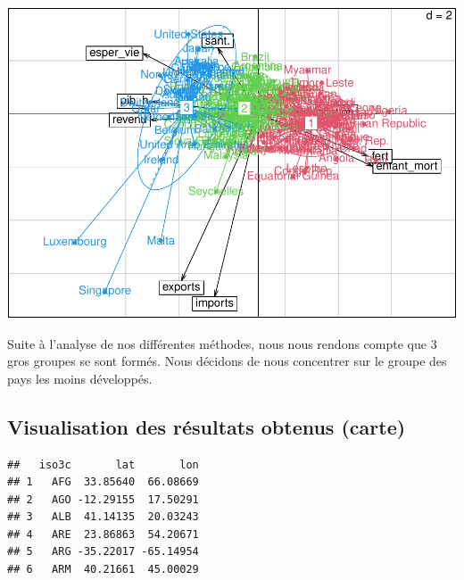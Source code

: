 \documentclass[
]{article}
\begin{document}
\includegraphics{Projet_files/figure-latex/unnamed-chunk-30-1.pdf}

Suite à l'analyse de nos différentes méthodes, nous nous rendons compte
que 3 gros groupes se sont formés. Nous décidons de nous concentrer sur
le groupe des pays les moins développés.

\hypertarget{visualisation-des-ruxe9sultats-obtenus-carte}{%
\subsection{Visualisation des résultats obtenus
(carte)}\label{visualisation-des-ruxe9sultats-obtenus-carte}}

\begin{verbatim}
##   iso3c       lat       lon
## 1   AFG  33.85640  66.08669
## 2   AGO -12.29155  17.50291
## 3   ALB  41.14135  20.03243
## 4   ARE  23.86863  54.20671
## 5   ARG -35.22017 -65.14954
## 6   ARM  40.21661  45.00029
\end{verbatim}
\end{document}
